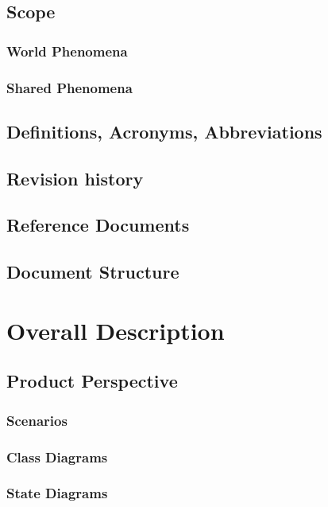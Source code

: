 \documentclass[11pt,twoside]{article}
\begin{document}
\subsection{Scope} 

\subsubsection{World Phenomena}
\subsubsection{Shared Phenomena}

\subsection{Definitions, Acronyms, Abbreviations}

\subsection{Revision history}

\subsection{Reference Documents}

\subsection{Document Structure}


\section{Overall Description}

\subsection{Product Perspective}

\subsubsection{Scenarios}
\subsubsection{Class Diagrams}
\subsubsection{State Diagrams}
\end{document}
